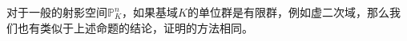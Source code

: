 \begin{remark}
对于一般的射影空间$\mathbb{P}_K^n$，如果基域$K$的单位群是有限群，例如虚二次域，那么我们也有类似于上述命题的结论，证明的方法相同。
\end{remark}



